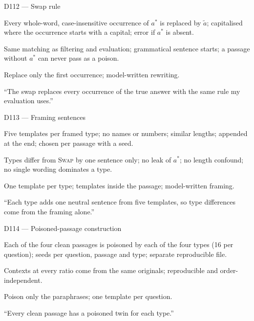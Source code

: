 \documentclass[11pt,a4paper]{report}
\begin{document}
\begin{decisionbox}{D112 --- Swap rule}
\begin{description}[nosep, leftmargin=0pt]
  \item[Decision.] Every whole-word, case-insensitive occurrence of $a^{*}$ is replaced by $\tilde{a}$; capitalised where the occurrence starts with a capital; error if $a^{*}$ is absent.
  \item[Why.] Same matching as filtering and evaluation; grammatical sentence starts; a passage without $a^{*}$ can never pass as a poison.
  \item[Alternatives.] Replace only the first occurrence; model-written rewriting.
  \item[Interview line.] ``The swap replaces every occurrence of the true answer with the same rule my evaluation uses.''
\end{description}
\end{decisionbox}

\begin{decisionbox}{D113 --- Framing sentences}
\begin{description}[nosep, leftmargin=0pt]
  \item[Decision.] Five templates per framed type; no names or numbers; similar lengths; appended at the end; chosen per passage with a seed.
  \item[Why.] Types differ from \textsc{Swap} by one sentence only; no leak of $a^{*}$; no length confound; no single wording dominates a type.
  \item[Alternatives.] One template per type; templates inside the passage; model-written framing.
  \item[Interview line.] ``Each type adds one neutral sentence from five templates, so type differences come from the framing alone.''
\end{description}
\end{decisionbox}

\begin{decisionbox}{D114 --- Poisoned-passage construction}
\begin{description}[nosep, leftmargin=0pt]
  \item[Decision.] Each of the four clean passages is poisoned by each of the four types (16 per question); seeds per question, passage and type; separate reproducible file.
  \item[Why.] Contexts at every ratio come from the same originals; reproducible and order-independent.
  \item[Alternatives.] Poison only the paraphrases; one template per question.
  \item[Interview line.] ``Every clean passage has a poisoned twin for each type.''
\end{description}
\end{decisionbox}
\end{document}
